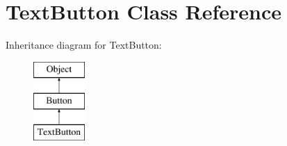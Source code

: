\hypertarget{class_text_button}{}\section{Text\+Button Class Reference}
\label{class_text_button}
Inheritance diagram for Text\+Button\+:\begin{figure}[H]
\begin{center}
\leavevmode
\includegraphics[height=3.000000cm]{class_text_button}
\end{center}
\end{figure}
